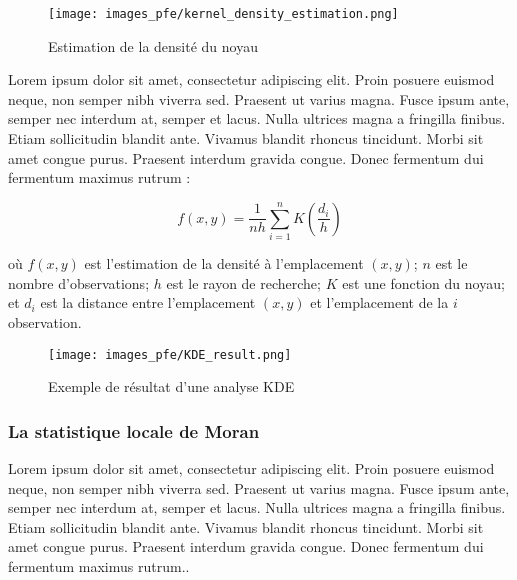 \begin{figure}[hbt!]
  \centering
  \texttt{[image: images\_pfe/kernel\_density\_estimation.png]}
  \caption{Estimation de la densité du noyau \parencite{hart_kernel_2014}}
  \label{fig:kde}
\end{figure}
\FloatBarrier

\medskip

\medskip

Lorem ipsum dolor sit amet, consectetur adipiscing elit. Proin posuere euismod neque, non semper nibh viverra sed. Praesent ut varius magna. Fusce ipsum ante, semper nec interdum at, semper et lacus. Nulla ultrices magna a fringilla finibus. Etiam sollicitudin blandit ante. Vivamus blandit rhoncus tincidunt. Morbi sit amet congue purus. Praesent interdum gravida congue. Donec fermentum dui fermentum maximus rutrum \parencite{fotheringham_quantitative_2007} :

\medskip

\begin{equation}
   \displaystyle f(x,y) = \frac{1}{nh} \sum_{i=1}^{n} K (\frac{d_i}{h})
   \label{kernel-density-estimation}
\end{equation}

\medskip

où $f(x, y)$ est l'estimation de la densité à l'emplacement $(x, y)$; $n$ est le nombre d'observations; $h$ est le rayon de recherche; $K$ est une fonction du noyau; et $d_i$ est la distance entre l'emplacement $(x, y)$ et l'emplacement de la $i$ observation.




\medskip


\begin{figure}[hbt!]
  \centering
  \texttt{[image: images\_pfe/KDE\_result.png]}
  \caption{Exemple de résultat d'une analyse KDE \parencite{romano_visualizing_2017}}
  \label{fig:kde-result}
\end{figure}
\FloatBarrier

\medskip

\subsubsection{La statistique locale de Moran}
Lorem ipsum dolor sit amet, consectetur adipiscing elit. Proin posuere euismod neque, non semper nibh viverra sed. Praesent ut varius magna. Fusce ipsum ante, semper nec interdum at, semper et lacus. Nulla ultrices magna a fringilla finibus. Etiam sollicitudin blandit ante. Vivamus blandit rhoncus tincidunt. Morbi sit amet congue purus. Praesent interdum gravida congue. Donec fermentum dui fermentum maximus rutrum.\parencite{hart_kernel_2014}. 

